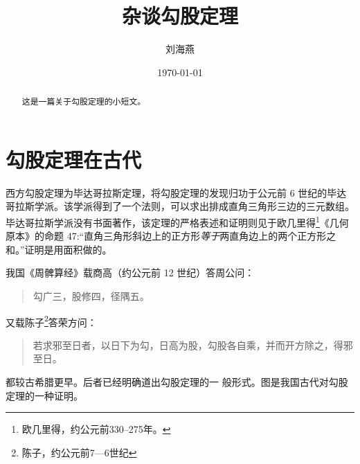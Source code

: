 \documentclass[UTF8]{ctexart}  %
\title{\heiti 杂谈勾股定理}
\author{\kaishu 刘海燕}
\date{\today}
\begin{document}
	\maketitle
	
	\begin{abstract}
		这是一篇关于勾股定理的小短文。
	\end{abstract}
	
	\tableofcontents %
	
	\section{勾股定理在古代} %
	西方勾股定理为毕达哥拉斯定理，将勾股定理的发现归功于公元前
	6
	世纪的毕达哥拉斯学派。该学派得到了一个法则，可以求出排成直角三角形三边的三元数组。毕达哥拉斯学派没有书面著作，该定理的严格表述和证明则见于欧几里得\footnote{欧几里得，约公元前330--275年。}《几何原本》的命题
	47:“直角三角形斜边上的正方形\emph{等于}两直角边上的两个正方形之和。”证明是用面积做的。
	
	我国《周髀算经》载商高（约公元前 12 世纪）答周公问：
	\begin{quote}
		勾广三，股修四，径隅五。
	\end{quote}
	又载陈子\footnote{陈子，约公元前7---6世纪}答荣方问：
	\begin{quote}
		\kaishu 若求邪至日者，以日下为勾，日高为股，勾股各自乘，并而开方除之，得邪至日。
	\end{quote}
	都较古希腊更早。后者已经明确道出勾股定理的一 般形式。图是我国古代对勾股定理的一种证明。
	
	
\end{document}
